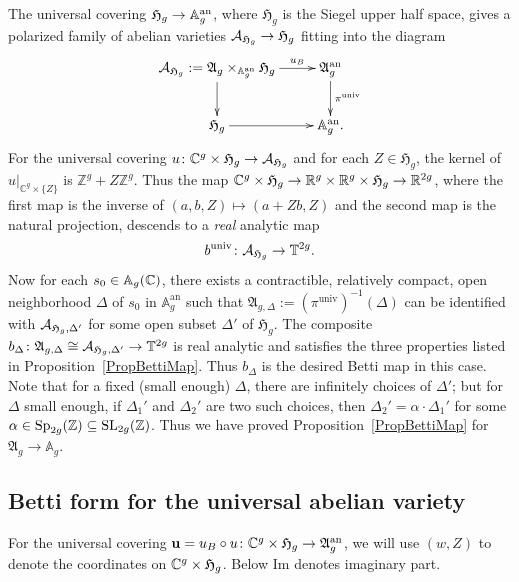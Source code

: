 The universal covering $\mathfrak{H}_g \rightarrow {\mathbb A}^{\mathrm{an}}_g$,
where $\mathfrak{H}_g$ is the Siegel upper half space, gives a
polarized family of abelian varieties
$\mathcal{A}_{\mathfrak{H}_g} \rightarrow \mathfrak{H}_g$ fitting into the diagram
\[
\xymatrix{
\cA_{\mathfrak{H}_g} := \mathfrak{A}_g \times_{\an{\mathbb A}_g}\mathfrak{H}_g \ar[r]^-{u_B} \ar[d] & \an{\mathfrak{A}}_g \ar[d]^{\pi^{\mathrm{univ}}} \\
\mathfrak{H}_g \ar[r] & \an{\mathbb A}_g.
}
\]
For the universal covering $u \colon {\mathbb{C}}^g \times \mathfrak{H}_g
\rightarrow \mathcal{A}_{\mathfrak{H}_g}$ and for each $Z \in
\mathfrak{H}_g$, the kernel of $u|_{\mathbb{C}^g \times \{Z\}}$ is
$\mathbb{Z}^g + Z \mathbb{Z}^g$. Thus the map ${\mathbb{C}}^g \times
\mathfrak{H}_g \rightarrow {\mathbb{R}}^g \times {\mathbb{R}}^g \times
\mathfrak{H}_g \rightarrow {\mathbb{R}}^{2g}$, where the first map is the
inverse of $(a,b,Z) \mapsto (a + Z  b,Z)$ and the second map is the
natural projection, descends to a \textit{real} analytic map
\[
b^{\mathrm{univ}} \colon \mathcal{A}_{\mathfrak{H}_g} \rightarrow \mathbb T^{2g}.
\]
 Now for each $s_0 \in \mathbb A_g({\mathbb{C}})$, there exists a contractible,
 relatively compact, open neighborhood $\Delta$ of $s_0$ in $\mathbb A_g^{\mathrm{an}}$ such that $\mathfrak{A}_{g,\Delta}:=(\pi^{\mathrm{univ}})^{-1}(\Delta)$ can be identified with $\mathcal{A}_{\mathfrak{H}_g,\Delta'}$ for some open subset $\Delta'$ of $\mathfrak{H}_g$. The composite $b_{\Delta} \colon \mathfrak{A}_{g,\Delta} \cong \mathcal{A}_{\mathfrak{H}_g,\Delta'} \rightarrow \mathbb T^{2g}$ is  real analytic and satisfies the three properties listed in Proposition~\ref{PropBettiMap}. Thus $b_{\Delta}$ is the desired Betti map in this case. Note that for a fixed (small enough) $\Delta$, there are infinitely choices of $\Delta'$; but for $\Delta$ small enough, if $\Delta_1'$ and $\Delta_2'$ are two such choices, then $\Delta_2' = \alpha \cdot \Delta_1'$ for some $\alpha \in \mathrm{Sp}_{2g}({\mathbb{Z}}) \subseteq \mathrm{SL}_{2g}({\mathbb{Z}})$. Thus we have proved Proposition~\ref{PropBettiMap} for $\mathfrak{A}_g \rightarrow \mathbb A_g$.


\subsection{Betti form for the universal abelian variety}

\newcommand{\X}{X}
\newcommand{\Y}{Y}
\newcommand{\rmd}{\mathrm{d}}
\newcommand{\tran}[1]{{{#1}}^{\!^{\intercal}}}


For the universal covering $\mathbf{u} = u_B\circ u \colon {\mathbb{C}}^g
\times \mathfrak{H}_g \rightarrow \mathfrak{A}_g^{\mathrm{an}}$, we
will use $(w,Z)$ to denote the coordinates on ${\mathbb{C}}^g \times
\mathfrak{H}_g$.
Below $\mathrm{Im}$ denotes imaginary part. 



